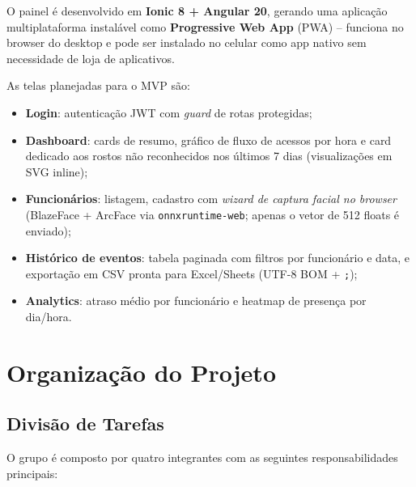 \documentclass[12pt,a4paper]{report}
\begin{document}
O painel é desenvolvido em \textbf{Ionic 8 + Angular 20}, gerando uma aplicação multiplataforma instalável como \textbf{Progressive Web App} (PWA) -- funciona no browser do desktop e pode ser instalado no celular como app nativo sem necessidade de loja de aplicativos.

As telas planejadas para o MVP são:

\begin{itemize}
    \item \textbf{Login}: autenticação JWT com \textit{guard} de rotas protegidas;
    \item \textbf{Dashboard}: cards de resumo, gráfico de fluxo de acessos por hora e card dedicado aos rostos não reconhecidos nos últimos 7 dias (visualizações em SVG inline);
    \item \textbf{Funcionários}: listagem, cadastro com \emph{wizard de captura facial no browser} (BlazeFace + ArcFace via \texttt{onnxruntime-web}; apenas o vetor de 512 floats é enviado);
    \item \textbf{Histórico de eventos}: tabela paginada com filtros por funcionário e data, e exportação em CSV pronta para Excel/Sheets (UTF-8 BOM + \texttt{;});
    \item \textbf{Analytics}: atraso médio por funcionário e heatmap de presença por dia/hora.
\end{itemize}

\chapter{Organização do Projeto}

\section{Divisão de Tarefas}

O grupo é composto por quatro integrantes com as seguintes responsabilidades principais:
\end{document}
